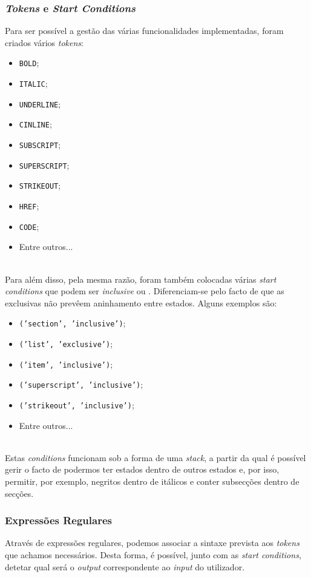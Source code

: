 \documentclass{article}
\begin{document}
\subsubsection{\textit{Tokens} e \textit{Start Conditions}}
Para ser possível a gestão das várias funcionalidades implementadas, foram criados vários \textit{tokens}: 
\begin{itemize}
\item \texttt{BOLD};
\item \texttt{ITALIC};
\item \texttt{UNDERLINE};
\item \texttt{CINLINE};
\item \texttt{SUBSCRIPT};
\item \texttt{SUPERSCRIPT};
\item \texttt{STRIKEOUT};
\item \texttt{HREF};
\item \texttt{CODE};
\item Entre outros...
\end{itemize}
\\
 Para além disso, pela mesma razão, foram também colocadas várias \textit{start conditions} que podem ser \textit{inclusive} ou . Diferenciam-se pelo facto de que as exclusivas não prevêem aninhamento entre estados. Alguns exemplos são: 
\begin{itemize}
\item \texttt{('section', 'inclusive')};
\item \texttt{('list', 'exclusive')};
\item \texttt{('item', 'inclusive')};
\item \texttt{('superscript', 'inclusive')};
\item \texttt{('strikeout', 'inclusive')};
\item Entre outros...
\end{itemize}
\\
 Estas \textit{conditions} funcionam sob a forma de uma \textit{stack}, a partir da qual é possível gerir o facto de podermos ter estados dentro de outros estados e, por isso, permitir, por exemplo, negritos dentro de itálicos e conter subsecções dentro de secções. \subsubsection{Expressões Regulares}
Através de expressões regulares, podemos associar a sintaxe prevista aos \textit{tokens} que achamos necessários. Desta forma, é possível, junto com as \textit{start conditions}, detetar qual será o \textit{output} correspondente ao \textit{input} do utilizador.\\
\end{document}

